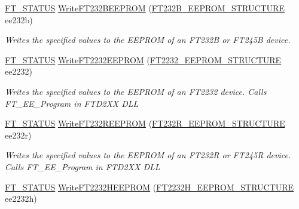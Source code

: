 \begin{DoxyCompactItemize}
\mbox{\hyperlink{class_f_t_d2_x_x___n_e_t_1_1_f_t_d_i_aabe20ad905cc4ccc1e35dd5b877d9a83}{F\+T\+\_\+\+S\+T\+A\+T\+US}} \mbox{\hyperlink{class_f_t_d2_x_x___n_e_t_1_1_f_t_d_i_a3c61a638655854afcccb470afa8760aa}{Write\+F\+T232\+B\+E\+E\+P\+R\+OM}} (\mbox{\hyperlink{class_f_t_d2_x_x___n_e_t_1_1_f_t_d_i_1_1_f_t232_b___e_e_p_r_o_m___s_t_r_u_c_t_u_r_e}{F\+T232\+B\+\_\+\+E\+E\+P\+R\+O\+M\+\_\+\+S\+T\+R\+U\+C\+T\+U\+RE}} ee232b)
\begin{DoxyCompactList}\small\item\em Writes the specified values to the E\+E\+P\+R\+OM of an F\+T232B or F\+T245B device. \end{DoxyCompactList}\item 
\mbox{\hyperlink{class_f_t_d2_x_x___n_e_t_1_1_f_t_d_i_aabe20ad905cc4ccc1e35dd5b877d9a83}{F\+T\+\_\+\+S\+T\+A\+T\+US}} \mbox{\hyperlink{class_f_t_d2_x_x___n_e_t_1_1_f_t_d_i_af69c3029c68b8b8023286cc8a9c7d82b}{Write\+F\+T2232\+E\+E\+P\+R\+OM}} (\mbox{\hyperlink{class_f_t_d2_x_x___n_e_t_1_1_f_t_d_i_1_1_f_t2232___e_e_p_r_o_m___s_t_r_u_c_t_u_r_e}{F\+T2232\+\_\+\+E\+E\+P\+R\+O\+M\+\_\+\+S\+T\+R\+U\+C\+T\+U\+RE}} ee2232)
\begin{DoxyCompactList}\small\item\em Writes the specified values to the E\+E\+P\+R\+OM of an F\+T2232 device. Calls F\+T\+\_\+\+E\+E\+\_\+\+Program in F\+T\+D2\+XX D\+LL \end{DoxyCompactList}\item 
\mbox{\hyperlink{class_f_t_d2_x_x___n_e_t_1_1_f_t_d_i_aabe20ad905cc4ccc1e35dd5b877d9a83}{F\+T\+\_\+\+S\+T\+A\+T\+US}} \mbox{\hyperlink{class_f_t_d2_x_x___n_e_t_1_1_f_t_d_i_a225cc45ca6451e2e5c17f2bb7fd27d9e}{Write\+F\+T232\+R\+E\+E\+P\+R\+OM}} (\mbox{\hyperlink{class_f_t_d2_x_x___n_e_t_1_1_f_t_d_i_1_1_f_t232_r___e_e_p_r_o_m___s_t_r_u_c_t_u_r_e}{F\+T232\+R\+\_\+\+E\+E\+P\+R\+O\+M\+\_\+\+S\+T\+R\+U\+C\+T\+U\+RE}} ee232r)
\begin{DoxyCompactList}\small\item\em Writes the specified values to the E\+E\+P\+R\+OM of an F\+T232R or F\+T245R device. Calls F\+T\+\_\+\+E\+E\+\_\+\+Program in F\+T\+D2\+XX D\+LL \end{DoxyCompactList}\item 
\mbox{\hyperlink{class_f_t_d2_x_x___n_e_t_1_1_f_t_d_i_aabe20ad905cc4ccc1e35dd5b877d9a83}{F\+T\+\_\+\+S\+T\+A\+T\+US}} \mbox{\hyperlink{class_f_t_d2_x_x___n_e_t_1_1_f_t_d_i_a861359cedea2bb55f0b8a787d5e6a8cb}{Write\+F\+T2232\+H\+E\+E\+P\+R\+OM}} (\mbox{\hyperlink{class_f_t_d2_x_x___n_e_t_1_1_f_t_d_i_1_1_f_t2232_h___e_e_p_r_o_m___s_t_r_u_c_t_u_r_e}{F\+T2232\+H\+\_\+\+E\+E\+P\+R\+O\+M\+\_\+\+S\+T\+R\+U\+C\+T\+U\+RE}} ee2232h)

\end{DoxyCompactItemize}
